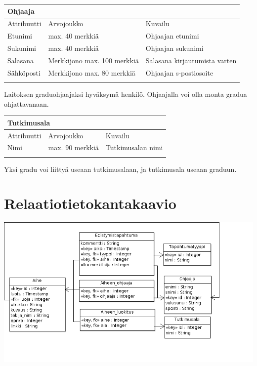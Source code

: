 \documentclass[11pt,a4paper,finnish,oneside]{article}
\begin{document}
\vspace{2em}
    \begin{tabular}{ | p{3cm} | p{3cm} | p{6cm} |}
    \multicolumn{3}{l}{\textbf{Ohjaaja}} \\ \hline
    {\small Attribuutti} & {\small Arvojoukko} & {\small Kuvailu}\\ \hline
    Etunimi & max. 40 merkkiä & Ohjaajan etunimi\\ \hline
    Sukunimi & max. 40 merkkiä & Ohjaajan sukunimi\\ \hline
    Salasana & Merkkijono max. 100 merkkiä & Salasana kirjautumista varten \\ \hline    
    Sähköposti & Merkkijono max. 80 merkkiä & Ohjaajan s-postiosoite \\ \hline
    \multicolumn{3}{l}{} \\

    \end{tabular}
Laitoksen graduohjaajaksi hyväksymä henkilö. Ohjaajalla voi olla monta gradua ohjattavanaan.

\vspace{2em}
    \begin{tabular}{ | p{3cm} | p{3cm} | p{6cm} |}
    \multicolumn{3}{l}{\textbf{Tutkimusala}} \\ \hline
    {\small Attribuutti} & {\small Arvojoukko} & {\small Kuvailu}\\ \hline
    Nimi & max. 90 merkkiä & Tutkimusalan nimi\\ \hline
    \multicolumn{3}{l}{} \\

    \end{tabular}
Yksi gradu voi liittyä useaan tutkimusalaan, ja tutkimusala useaan graduun.

\vspace{20em}
\section{Relaatiotietokantakaavio}

\includegraphics [width=7in]{classDiagram1.png}
\vspace{2em}
\end{document}
